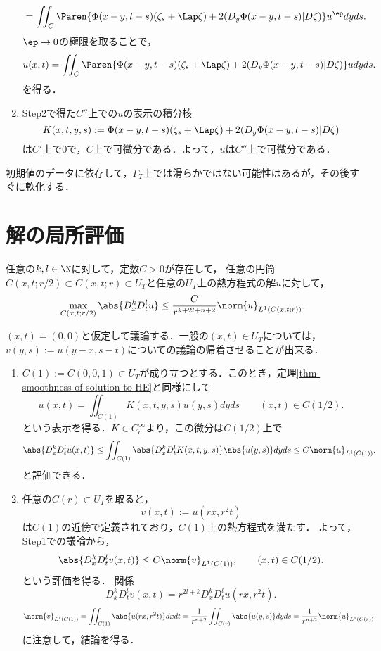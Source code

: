 \documentclass[uplatex,dvipdfmx]{jsreport}
\begin{document}
\begin{Proof}
\begin{enumerate}[{Step}1]
\begin{align*}
            &=\iint_C\Paren{\Phi(x-y,t-s)(\zeta_s+\Lap\zeta)+2(D_y\Phi(x-y,t-s)|D\zeta)}u^\ep dyds.
        \end{align*}
        $\ep\to0$の極限を取ることで，
        \[u(x,t)=\iint_C\Paren{\Phi(x-y,t-s)(\zeta_s+\Lap\zeta)+2(D_y\Phi(x-y,t-s)|D\zeta)}u dyds.\]
        を得る．
        \item Step2で得た$C''$上での$u$の表示の積分核
        \[K(x,t,y,s):=\Phi(x-y,t-s)(\zeta_s+\Lap\zeta)+2(D_y\Phi(x-y,t-s)|D\zeta)\]
        は$C'$上で$0$で，$C$上で可微分である．よって，$u$は$C''$上で可微分である．
    \end{enumerate}
\end{Proof}
\begin{remark}
    初期値のデータに依存して，$\Gamma_T$上では滑らかではない可能性はあるが，その後すぐに軟化する．
\end{remark}

\section{解の局所評価}

\begin{theorem}
    任意の$k,l\in\N$に対して，定数$C>0$が存在して，
    任意の円筒$C(x,t;r/2)\subset C(x,t;r)\subset U_T$と任意の$U_T$上の熱方程式の解$u$に対して，
    \[\max_{C(x,t;r/2)}\abs{D^k_xD^l_tu}\le\frac{C}{r^{k+2l+n+2}}\norm{u}_{L^1(C(x,t;r))}.\]
\end{theorem}
\begin{Proof}
    $(x,t)=(0,0)$と仮定して議論する．一般の$(x,t)\in U_T$については，$v(y,s):=u(y-x,s-t)$についての議論の帰着させることが出来る．
    \begin{enumerate}[{Step}1]
        \item $C(1):=C(0,0,1)\subset U_T$が成り立つとする．このとき，定理\ref{thm-smoothness-of-solution-to-HE}と同様にして
        \[u(x,t)=\iint_{C(1)}K(x,t,y,s)u(y,s)dyds\qquad(x,t)\in C(1/2).\]
        という表示を得る．$K\in C_c^\infty$より，この微分は$C(1/2)$上で
        \[\abs{D_x^kD_t^lu(x,t)}\le\iint_{C(1)}\abs{D_x^kD_t^lK(x,t,y,s)}\abs{u(y,s)}dyds\le C\norm{u}_{L^1(C(1))}.\]
        と評価できる．
        \item 任意の$C(r)\subset U_T$を取ると，
        \[v(x,t):=u(rx,r^2t)\]
        は$C(1)$の近傍で定義されており，$C(1)$上の熱方程式を満たす．
        よって，Step1での議論から，
        \[\abs{D_x^kD_t^lv(x,t)}\le C\norm{v}_{L^1(C(1))},\qquad (x,t)\in C(1/2).\]
        という評価を得る．
        関係
        \[D_x^kD_t^lv(x,t)=r^{2l+k}D_x^kD_t^lu(rx,r^2t).\]
        \[\norm{v}_{L^1(C(1))}=\iint_{C(1)}\abs{u(rx,r^2t)}dxdt=\frac{1}{r^{n+2}}\iint_{C(r)}\abs{u(y,s)}dyds=\frac{1}{r^{n+2}}\norm{u}_{L^1(C(r))}.\]
        に注意して，結論を得る．
    \end{enumerate}
\end{Proof}
\end{document}
